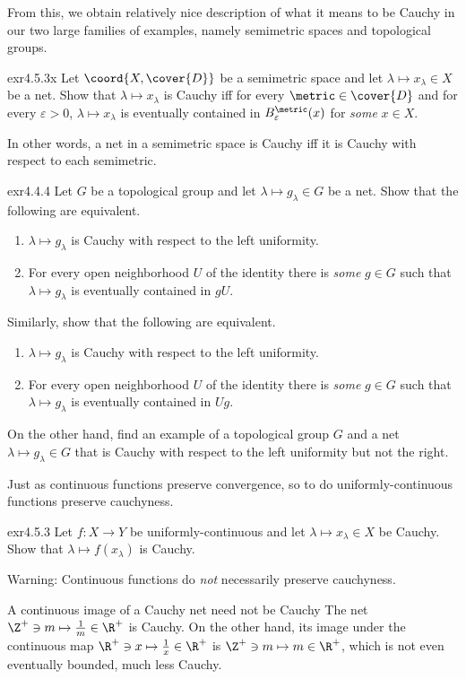 From this, we obtain relatively nice description of what it means to be Cauchy in our two large families of examples, namely semimetric spaces and topological groups.
\begin{exr}{}{exr4.5.3x}
Let $\coord{X,\cover{D}}$ be a semimetric space and let $\lambda \mapsto x_\lambda \in X$ be a net.  Show that $\lambda \mapsto x_\lambda$ is Cauchy iff for every $\metric \in \cover{D}$ and for every $\varepsilon >0$, $\lambda \mapsto x_\lambda$ is eventually contained in $B_{\varepsilon}^{\metric}(x)$ for \emph{some} $x\in X$.
\begin{rmk}
In other words, a net in a semimetric space is Cauchy iff it is Cauchy with respect to each semimetric.
\end{rmk}
\end{exr}
\begin{exr}{}{exr4.4.4}
Let $G$ be a topological group and let $\lambda \mapsto g_\lambda \in G$ be a net.  Show that the following are equivalent.
\begin{enumerate}
\item $\lambda \mapsto g_\lambda$ is Cauchy with respect to the left uniformity.
\item For every open neighborhood $U$ of the identity there is \emph{some} $g\in G$ such that $\lambda \mapsto g_\lambda$ is eventually contained in $gU$.
\end{enumerate}
Similarly, show that the following are equivalent.
\begin{enumerate}
\item $\lambda \mapsto g_\lambda$ is Cauchy with respect to the left uniformity.

\item For every open neighborhood $U$ of the identity there is \emph{some} $g\in G$ such that $\lambda \mapsto g_\lambda$ is eventually contained in $Ug$.
\end{enumerate}
On the other hand, find an example of a topological group $G$ and a net $\lambda \mapsto g_{\lambda}\in G$ that is Cauchy with respect to the left uniformity but not the right.
\end{exr}

Just as continuous functions preserve convergence, so to do uniformly-continuous functions preserve cauchyness.
\begin{exr}{}{exr4.5.3}
Let $f\colon X\rightarrow Y$ be uniformly-continuous and let $\lambda \mapsto x_\lambda \in X$ be Cauchy.  Show that $\lambda \mapsto f(x_\lambda)$ is Cauchy.
\begin{wrn}
Warning:  Continuous functions do \emph{not} necessarily preserve cauchyness.
\end{wrn}
\end{exr}
\begin{exm}{A continuous image of a Cauchy net need not be Cauchy}{}
The net $\Z ^+\ni m\mapsto \frac{1}{m}\in \R ^+$ is Cauchy.  On the other hand, its image under the continuous map $\R ^+\ni x\mapsto \frac{1}{x}\in \R ^+$ is $\Z ^+\ni m\mapsto m\in \R ^+$, which is not even eventually bounded, much less Cauchy.
\end{exm}

